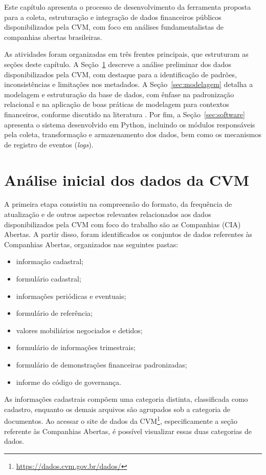 Este capítulo apresenta o processo de desenvolvimento da ferramenta proposta para a coleta, estruturação e integração de dados financeiros públicos disponibilizados pela CVM, com foco em análises fundamentalistas de companhias abertas brasileiras.

As atividades foram organizadas em três frentes principais, que estruturam as seções deste capítulo. A Seção~\ref{sec:analise_cvm} descreve a análise preliminar dos dados disponibilizados pela CVM, com destaque para a identificação de padrões, inconsistências e limitações nos metadados. A Seção~\ref{sec:modelagem} detalha a modelagem e estruturação da base de dados, com ênfase na padronização relacional e na aplicação de boas práticas de modelagem para contextos financeiros, conforme discutido na literatura \cite{elmasri:2016:fundamentals}. Por fim, a Seção~\ref{sec:software} apresenta o sistema desenvolvido em Python, incluindo os módulos responsáveis pela coleta, transformação e armazenamento dos dados, bem como os mecanismos de registro de eventos (\textit{logs}).


\section{Análise inicial dos dados da CVM} \label{sec:analise_cvm}

A primeira etapa consistiu na compreensão do formato, da frequência de atualização e de outros aspectos relevantes relacionados aos dados disponibilizados pela CVM com foco do trabalho são as Companhias (CIA) Abertas. A partir disso, foram identificados os conjuntos de dados referentes às Companhias Abertas, organizados nas seguintes pastas:

\begin{itemize}
	\item informação cadastral;
	\item formulário cadastral;
	\item informações periódicas e eventuais;
	\item formulário de referência;
	\item valores mobiliários negociados e detidos;
	\item formulário de informações trimestrais;
	\item formulário de demonstrações financeiras padronizadas;
	\item informe do código de governança.
\end{itemize}

As informações cadastrais compõem uma categoria distinta, classificada como cadastro, enquanto os demais arquivos são agrupados sob a categoria de documentos. Ao acessar o site de dados da CVM\footnote{\url{https://dados.cvm.gov.br/dados/}}, especificamente a seção referente às Companhias Abertas, é possível visualizar essas duas categorias de dados.

